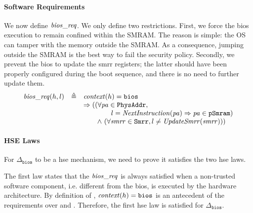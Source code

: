 \paragraph{Software Requirements}
%
We now define $\mathit{bios\_req}$.
%
We only define two restrictions.
%
First, we force the \ac{bios} execution to remain confined within the SMRAM.
%
The reason is simple: the OS can tamper with the memory outside the SMRAM.
%
As a consequence, jumping outside the SMRAM is the best way to fail the security
policy.
%
Secondly, we prevent the \ac{bios} to update the \ac{smrr} registers;
%
the latter should have been properly configured during the boot sequence, and
there is no need to further update them.
%
\[
  \begin{array}{rcl}
    \func{bios\_req}(h, l)
    & \triangleq
    & \func{context}(h) = \val{bios} \\
    & %
    & \Rightarrow ((\forall \var{pa} \in \texttt{PhysAddr}, \\
    & %
    & \qquad\qquad l = \func{NextInstruction}(\var{pa})
      \Rightarrow \var{pa} \in \texttt{pSmram}) \\
    & %
    & \qquad\wedge~(\forall \var{smrr} \in \texttt{Smrr}, l \neq \func{UpdateSmrr}(\var{smrr})))
  \end{array}
\]

\paragraph{HSE Laws}
%
For $\Delta_{\mathtt{bios}}$ to be a \ac{hse} mechanism, we need to prove it
satisfies the two \ac{hse} laws.

The first law states that the \( \mathit{bios\_req} \) is always satisfied when a
non-trusted software component, i.e. different from the \ac{bios}, is executed
by the hardware architecture.
%
By definition of , \( \mathit{context}(h) = \mathtt{bios} \) is an
antecedent of the requirements over  and
.
%
Therefore, the first \ac{hse} law is satisfied for \( \Delta_{\mathtt{bios}} \).

